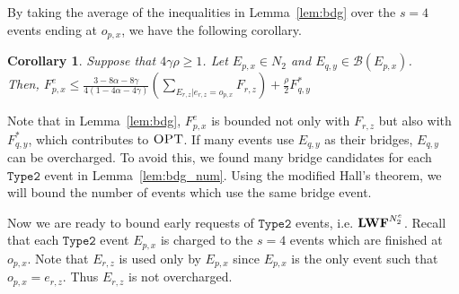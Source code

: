 \documentclass[11pt]{article}
\newtheorem{corollary}[lemma]{Corollary}
\newcommand{\opt}{\textrm{\sc OPT}}
\newcommand{\two}{\texttt{Type2}}
\newcommand{\len}{\mathfrak{\rho}}
\newcommand{\fe}{F^e}
\newcommand{\lwfnetwo}{\lwf^{N_2^e}}
\begin{document}
\begin{titlepage}
By taking the average of the inequalities in Lemma~\ref{lem:bdg} over the $s=4$ events ending at $o_{p,x}$, we have the
following corollary.

\begin{corollary}
    \label{cor:bdg}
    Suppose that $4 \gamma \len \geq 1$. Let $E_{p,x} \in N_2$ and
    $E_{q,y} \in \mathcal{B}(E_{p,x})$. \\ Then, $\fe_{p,x} \leq \frac{3
      - 8\alpha - 8\gamma}{4(1 - 4\alpha - 4\gamma)} (\sum_{E_{r,z}| e_{r,z} =
      o_{p,x}} F_{r,z}) + \frac{\len}{2} F^*_{q,y}$
\end{corollary}

Note that in Lemma~\ref{lem:bdg}, $\fe_{p,x}$ is bounded not only with $F_{r,z}$ but also with $F^*_{q,y}$, which
contributes to $\opt$. If many events use $E_{q,y}$ as their bridges, $E_{q,y}$ can be overcharged. To avoid this, we
found many bridge candidates for each $\two$ event in Lemma~\ref{lem:bdg_num}. Using the modified Hall's theorem, we
will bound the number of events which use the same bridge event.

Now we are ready to bound early requests of $\two$ events, i.e. $\lwfnetwo$. Recall that each $\two$ event $E_{p,x}$ is
charged to the $s=4$ events which are finished at $o_{p,x}$. Note that $E_{r,z}$ is used only by $E_{p,x}$ since
$E_{p,x}$ is the only event such that $o_{p,x} = e_{r,z}$. Thus $E_{r,z}$ is not overcharged.



\end{titlepage}
\end{document}
